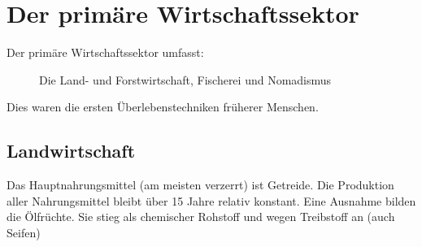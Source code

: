 \section{Der primäre Wirtschaftssektor}
\begin{description}
	\item[Der primäre Wirtschaftssektor umfasst:] Die Land- und Forstwirtschaft, Fischerei und Nomadismus
\end{description}
Dies waren die ersten Überlebenstechniken früherer Menschen.

\subsection{Landwirtschaft}
\begin{figurewrapper}
\end{figurewrapper}


Das Hauptnahrungsmittel (am meisten verzerrt) ist Getreide.
Die Produktion aller Nahrungsmittel bleibt über 15 Jahre relativ konstant.
Eine Ausnahme bilden die Ölfrüchte.
Sie stieg als chemischer Rohstoff und wegen Treibstoff an (auch Seifen)

